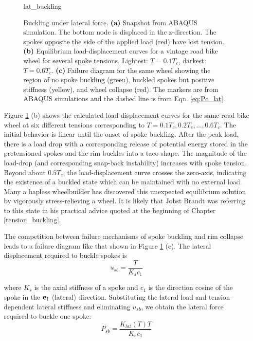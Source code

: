 \documentclass[\rootdir/thesis.tex]{subfiles}
\begin{document}
\begin{figure}
\centering
{lat_buckling} 
\caption{Buckling under lateral force. \textbf{(a)} Snapshot from ABAQUS simulation. The bottom node is displaced in the z-direction. The spokes opposite the side of the applied load (red) have lost tension. \textbf{(b)} Equilibrium load-displacement curves for a vintage road bike wheel for several spoke tensions. Lightest: $T=0.1T_c$, darkest: $T=0.6T_c$. \textbf{(c)} Failure diagram for the same wheel showing the region of no spoke buckling (green), buckled spokes but positive stiffness (yellow), and wheel collapse (red). The markers are from ABAQUS simulations and the dashed line is from Eqn. \eqref{eq:Pc_lat}.}
\label{fig:lat_buckling}
\end{figure}

Figure \ref{fig:lat_buckling} (b) shows the calculated load-displacement curves for the same road bike wheel at six different tensions corresponding to $T=0.1T_c, 0.2T_c,...,0.6T_c$. The initial behavior is linear until the onset of spoke buckling. After the peak load, there is a load drop with a corresponding release of potential energy stored in the pretensioned spokes and the rim buckles into a taco shape. The magnitude of the load-drop (and corresponding snap-back instability) increases with spoke tension. Beyond about $0.5 T_c$, the load-displacement curve crosses the zero-axis, indicating the existence of a buckled state which can be maintained with no external load. Many a hapless wheelbuilder has discovered this unexpected equilibrium solution by vigorously stress-relieving a wheel. It is likely that Jobst Brandt was referring to this state in his practical advice quoted at the beginning of Chapter \ref{tension_buckling}.

The competition between failure mechanisms of spoke buckling and rim collapse leads to a failure diagram like that shown in Figure \ref{fig:lat_buckling} (c). The lateral displacement required to buckle spokes is
\begin{equation}
u_{sb} = \frac{T}{K_s c_1}
\end{equation}

where $K_s$ is the axial stiffness of a spoke and $c_1$ is the direction cosine of the spoke in the $\mathbf{e}_1$ (lateral) direction. Substituting the lateral load and tension-dependent lateral stiffness and eliminating $u_{sb}$, we obtain the lateral force required to buckle one spoke:
\begin{equation}
\label{eq:Pc_lat}
P_{sb} = \frac{K_{lat}(T) T}{K_s c_1}
\end{equation}
\end{document}
